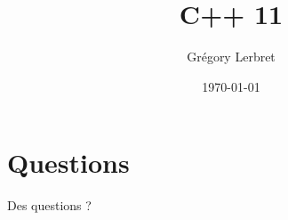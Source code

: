 \documentclass[t, 10pt,french]{beamer}
\author{Grégory Lerbret}
\title{C++ 11}
\date{\today}
\begin{document}
\frame[plain]{\maketitle}



\section*{Questions}
\begin{frame}[c]
	\begin{center}
		\huge Des questions ?
	\end{center}
\end{frame}


\end{document}
